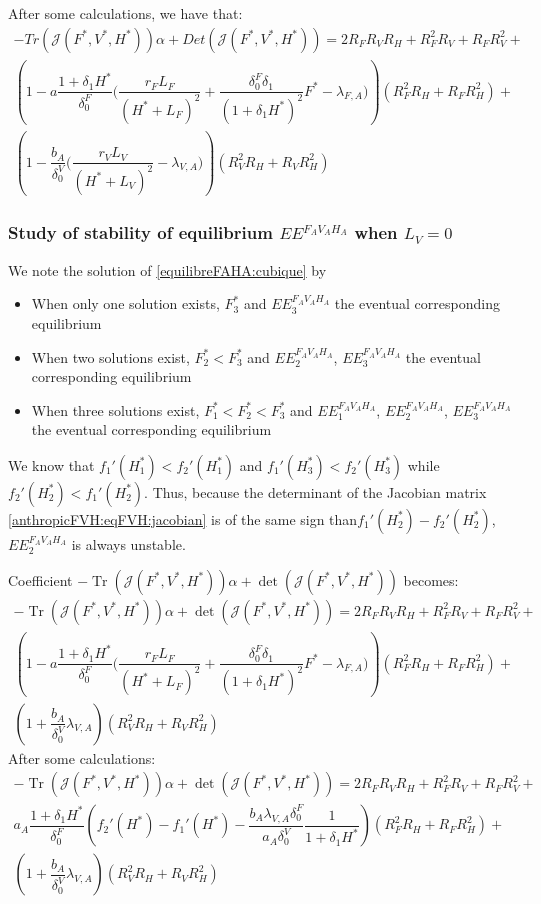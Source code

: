 \documentclass{article}
\newcommand{\lfa}{\lambda_{F, A}}
\newcommand{\lva}{\lambda_{V, A}}
\newcommand{\df}{\delta_0^F}
\newcommand{\dv}{\delta_0^V}
\DeclareMathOperator{\Tr}{Tr}
\begin{document}
\begin{itemize}
After some calculations, we have that:
\begin{multline}
-Tr(\mathcal{J}(F^*,V^*,H^*)) \alpha + Det(\mathcal{J}(F^*,V^*,H^*)) = 2 R_FR_VR_H + R_F^2R_V + R_FR_V^2 +  \\
\left(1 - a \dfrac{1 + \delta_1 H^*}{\df}\Big(\dfrac{r_F L_F}{(H^* + L_F)^2} + \dfrac{\df \delta_1}{(1+ \delta_1 H^*)^2}F^* - \lfa \Big)\right) \left(R_F^2R_H + R_FR_H^2\right) + \\
\left(1 - \dfrac{b_A}{\dv}\Big(\dfrac{r_V L_V}{(H^* + L_V)^2} - \lva \Big)\right) \left(R_V^2R_H + R_VR_H^2\right) 
\end{multline}
\end{itemize}

\subsubsection{Study of stability of equilibrium $EE^{F_AV_AH_A}$ when $L_V = 0$}
We note the solution of \eqref{equilibreFAHA:cubique} by
\begin{itemize}
\item When only one solution exists, $F^*_3$ and $EE^{F_AV_AH_A}_3$ the eventual corresponding equilibrium
\item When two solutions exist, $F^*_2 < F^*_3$ and  $EE^{F_AV_AH_A}_2$, $EE^{F_AV_AH_A}_3$ the eventual corresponding equilibrium
\item When three solutions exist, $F_1^* < F^*_2 < F^*_3$ and $EE^{F_AV_AH_A}_1$,  $EE^{F_AV_AH_A}_2$, $EE^{F_AV_AH_A}_3$ the eventual corresponding equilibrium
\end{itemize}

We know that $f_1'(H^*_1) < f_2'(H^*_1)$ and $f_1'(H^*_3) < f_2'(H^*_3)$ while $f_2'(H^*_2) < f_1'(H^*_2)$. Thus, because the determinant of the Jacobian matrix \eqref{anthropicFVH:eqFVH:jacobian} is of the same sign than$f_1'(H^*_2)-f_2'(H^*_2) $,  $EE^{F_AV_AH_A}_2$ is always unstable.

Coefficient $-\Tr(\mathcal{J}(F^*,V^*,H^*)) \alpha + \det(\mathcal{J}(F^*,V^*,H^*))$ becomes:
\begin{multline}
-\Tr(\mathcal{J}(F^*,V^*,H^*)) \alpha + \det(\mathcal{J}(F^*,V^*,H^*)) = 2 R_FR_VR_H + R_F^2R_V + R_FR_V^2 +  \\
\left(1 - a \dfrac{1 + \delta_1 H^*}{\df}\Big(\dfrac{r_F L_F}{(H^* + L_F)^2} + \dfrac{\df \delta_1}{(1+ \delta_1 H^*)^2}F^* - \lfa \Big)\right) \left(R_F^2R_H + R_FR_H^2\right) + \\
\left(1 + \dfrac{b_A}{\dv} \lva \right) \left(R_V^2R_H + R_VR_H^2\right) 
\end{multline}
After some calculations:
\begin{multline}
-\Tr(\mathcal{J}(F^*,V^*,H^*)) \alpha + \det(\mathcal{J}(F^*,V^*,H^*)) = 2 R_FR_VR_H + R_F^2R_V + R_FR_V^2 +  \\
a_A \dfrac{1 + \delta_1 H^*}{\df} \left(f_2'(H^*) - f_1'(H^*) - \dfrac{b_A \lva \df}{a_A \dv} \dfrac{1}{1+\delta_1 H^*}\right) \left(R_F^2R_H + R_FR_H^2\right) + \\
\left(1 + \dfrac{b_A}{\dv} \lva \right) \left(R_V^2R_H + R_VR_H^2\right) 
\end{multline}
\end{document}
